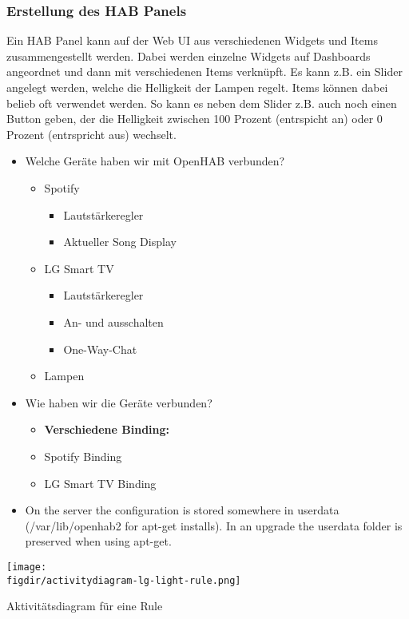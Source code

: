 		\subsubsection{Erstellung des HAB Panels}
		Ein HAB Panel kann auf der Web UI aus verschiedenen Widgets und Items zusammengestellt werden. Dabei werden einzelne Widgets auf Dashboards angeordnet und dann mit verschiedenen Items verknüpft. Es kann z.B. ein Slider angelegt werden, welche die Helligkeit der Lampen regelt. Items können dabei belieb oft verwendet werden. So kann es neben dem Slider z.B. auch noch einen Button geben, der die Helligkeit zwischen 100 Prozent (entrspicht an) oder 0 Prozent (entrspricht aus) wechselt.
		
		
\begin{itemize}
	\item Welche Geräte haben wir mit OpenHAB verbunden?
	\begin{itemize}
		\item Spotify
		\begin{itemize}
			\item Lautstärkeregler
			\item Aktueller Song Display
		\end{itemize}
		\item LG Smart TV
		\begin{itemize}
			\item Lautstärkeregler
			\item An- und ausschalten
			\item One-Way-Chat
		\end{itemize}
		\item Lampen
	\end{itemize}
	\item Wie haben wir die Geräte verbunden?
	\begin{itemize}
		\item \textbf{Verschiedene Binding:}
		\item Spotify Binding
		\item LG Smart TV Binding
	\end{itemize}
	\item On the server the configuration is stored somewhere in userdata (/var/lib/openhab2 for apt-get installs).
	In an upgrade the userdata folder is preserved when using apt-get.
\end{itemize}

\begin{minipage}{\textwidth}
	\centering
	\captionsetup{type=figure}
	\texttt{[image: \\figdir/activitydiagram-lg-light-rule.png]}
	\caption{Aktivitätsdiagram für eine Rule \label{fig:activity-diagram}}
\end{minipage}


